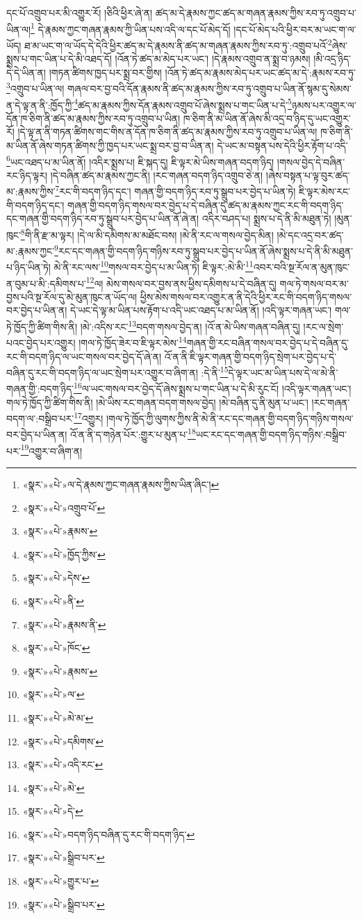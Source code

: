 དང་པོ་འགྲུབ་པར་མི་འགྱུར་རོ། །ཅིའི་ཕྱིར་ཞེ་ན། ཚད་མ་དེ་རྣམས་ཀྱང་ཚད་མ་གཞན་རྣམས་ཀྱིས་རབ་ཏུ་འགྲུབ་པ་ཡིན་ལ།\footnote{«སྣར་»«པེ་»ལ་དེ་རྣམས་ཀྱང་གཞན་རྣམས་ཀྱིས་ཡིན་ཞིང་།} དེ་རྣམས་ཀྱང་གཞན་རྣམས་ཀྱི་ཡིན་པས་འདི་ལ་དང་པོ་མེད་དོ། །དང་པོ་མེད་པའི་ཕྱིར་བར་མ་ཡང་ག་ལ་ཡོད། ཐ་མ་ཡང་ག་ལ་ཡོད་དེ་དེའི་ཕྱིར་ཚད་མ་དེ་རྣམས་ནི་ཚད་མ་གཞན་རྣམས་ཀྱིས་རབ་ཏུ་:འགྲུབ་པའོ་\footnote{«སྣར་»«པེ་»འགྲུབ་པོ་}ཞེས་སྨྲས་པ་གང་ཡིན་པ་དེ་མི་འཐད་དོ། །འོན་ཏེ་ཚད་མ་མེད་པར་ཡང་། །དེ་རྣམས་འགྲུབ་ན་སྨྲ་བ་ཉམས། །མི་འདྲ་ཉིད་དེ་དེ་ཡིན་ན། །གཏན་ཚིགས་ཁྱད་པར་སྨྲ་བར་གྱིས། །འོན་ཏེ་ཚད་མ་རྣམས་མེད་པར་ཡང་ཚད་མ་དེ་:རྣམས་རབ་ཏུ་\footnote{«སྣར་»«པེ་»རྣམས་}འགྲུབ་པ་ཡིན་ལ། གཞལ་བར་བྱ་བའི་དོན་རྣམས་ནི་ཚད་མ་རྣམས་ཀྱིས་རབ་ཏུ་འགྲུབ་པ་ཡིན་ནོ་སྙམ་དུ་སེམས་ན་དེ་ལྟ་ན་ནི་:ཁྱོད་ཀྱི་\footnote{«སྣར་»«པེ་»ཁྱོད་ཀྱིས་}ཚད་མ་རྣམས་ཀྱིས་དོན་རྣམས་འགྲུབ་པོ་ཞེས་སྨྲས་པ་གང་ཡིན་པ་དེ་\footnote{«སྣར་»«པེ་»དེས་}ཉམས་པར་འགྱུར་ལ་དོན་ཁ་ཅིག་ནི་ཚད་མ་རྣམས་ཀྱིས་རབ་ཏུ་འགྲུབ་པ་ཡིན། ཁ་ཅིག་ནི་མ་ཡིན་ནོ་ཞེས་མི་འདྲ་བ་ཉིད་དུ་ཡང་འགྱུར་རོ། །དེ་ལྟ་ན་ནི་གཏན་ཚིགས་གང་གིས་ན་དོན་ཁ་ཅིག་ནི་ཚད་མ་རྣམས་ཀྱིས་རབ་ཏུ་འགྲུབ་པ་ཡིན་ལ། ཁ་ཅིག་ནི་མ་ཡིན་ནོ་ཞེས་གཏན་ཚིགས་ཀྱི་ཁྱད་པར་ཡང་སྨྲ་བར་བྱ་བ་ཡིན་ན། དེ་ཡང་མ་བསྟན་པས་དེའི་ཕྱིར་རྟོག་པ་འདི་\footnote{«སྣར་»«པེ་»ནི་}ཡང་འཐད་པ་མ་ཡིན་ནོ། །འདིར་སྨྲས་པ། ཇི་སྐད་དུ། ཇི་ལྟར་མེ་ཡིས་གཞན་བདག་ཉིད། །གསལ་བྱེད་དེ་བཞིན་རང་ཉིད་ལྟར། །དེ་བཞིན་ཚད་མ་རྣམས་ཀྱང་ནི། །རང་གཞན་བདག་ཉིད་འགྲུབ་ཅེ་ན། །ཞེས་བསྟན་པ་ལྟ་བུར་ཚད་མ་:རྣམས་ཀྱིས་\footnote{«སྣར་»«པེ་»རྣམས་ནི་}རང་གི་བདག་ཉིད་དང་། གཞན་གྱི་བདག་ཉིད་རབ་ཏུ་སྒྲུབ་པར་བྱེད་པ་ཡིན་ཏེ། ཇི་ལྟར་མེས་རང་གི་བདག་ཉིད་དང་། གཞན་གྱི་བདག་ཉིད་གསལ་བར་བྱེད་པ་དེ་བཞིན་དུ་ཚད་མ་རྣམས་ཀྱང་རང་གི་བདག་ཉིད་དང་གཞན་གྱི་བདག་ཉིད་རབ་ཏུ་སྒྲུབ་པར་བྱེད་པ་ཡིན་ནོ་ཞེ་ན། འདིར་བཤད་པ། སྨྲས་པ་དེ་ནི་མི་མཐུན་ཏེ། །མུན་ཁུང་\footnote{«སྣར་»«པེ་»ཁོང་}གི་ནི་རྫ་མ་ལྟར། །དེ་ལ་མི་དམིགས་མ་མཐོང་བས། །མེ་ནི་རང་ལ་གསལ་བྱེད་མིན། །མེ་དང་འདྲ་བར་ཚད་མ་:རྣམས་ཀྱང་\footnote{«སྣར་»«པེ་»རྣམས་}རང་དང་གཞན་གྱི་བདག་ཉིད་གཉིས་རབ་ཏུ་སྒྲུབ་པར་བྱེད་པ་ཡིན་ནོ་ཞེས་སྨྲས་པ་དེ་ནི་མི་མཐུན་པ་ཉིད་ཡིན་ཏེ། མེ་ནི་རང་ལས་\footnote{«སྣར་»«པེ་»ལ་}གསལ་བར་བྱེད་པ་མ་ཡིན་ཏེ། ཇི་ལྟར་:མེ་མི་\footnote{«སྣར་»«པེ་»མེ་མ་}འབར་བའི་སྔ་རོལ་ན་མུན་ཁུང་ན་བུམ་པ་མི་:དམིགས་པ་\footnote{«སྣར་»«པེ་»དམིགས་}ལ། མེས་གསལ་བར་བྱས་ནས་ཕྱིས་དམིགས་པ་དེ་བཞིན་དུ། གལ་ཏེ་གསལ་བར་མ་བྱས་པའི་སྔ་རོལ་དུ་མེ་མུན་ཁུང་ན་ཡོད་ལ། ཕྱིས་མེས་གསལ་བར་འགྱུར་ན་ནི་དེའི་ཕྱིར་རང་གི་བདག་ཉིད་གསལ་བར་བྱེད་པ་ཡིན་ན། དེ་ཡང་དེ་ལྟ་མ་ཡིན་པས་རྟོག་པ་འདི་ཡང་འཐད་པ་མ་ཡིན་ནོ། །འདི་ལྟར་གཞན་ཡང་། གལ་ཏེ་ཁྱོད་ཀྱི་ཚིག་གིས་ནི། །མེ་:འདིས་རང་\footnote{«སྣར་»«པེ་»འདི་རང་}བདག་གསལ་བྱེད་ན། །འོ་ན་མེ་ཡིས་གཞན་བཞིན་དུ། །རང་ལ་སྲེག་པའང་བྱེད་པར་འགྱུར། །གལ་ཏེ་ཁྱོད་ཟེར་བ་ཇི་ལྟར་མེས་\footnote{«སྣར་»«པེ་»མེ་}གཞན་གྱི་རང་བཞིན་གསལ་བར་བྱེད་པ་དེ་བཞིན་དུ་རང་གི་བདག་ཉིད་ལ་ཡང་གསལ་བར་བྱེད་དོ་ཞེ་ན། འོ་ན་ནི་ཇི་ལྟར་གཞན་གྱི་བདག་ཉིད་སྲེག་པར་བྱེད་པ་དེ་བཞིན་དུ་རང་གི་བདག་ཉིད་ལ་ཡང་སྲེག་པར་འགྱུར་བ་ཞིག་ན། :དེ་ནི་\footnote{«སྣར་»«པེ་»དེ་}དེ་ལྟར་ཡང་མ་ཡིན་པས་དེ་ལ་མེ་ནི་གཞན་གྱི་:བདག་ཉིད་\footnote{«སྣར་»«པེ་»བདག་ཉིད་བཞིན་དུ་རང་གི་བདག་ཉིད་}ལ་ཡང་གསལ་བར་བྱེད་དོ་ཞེས་སྨྲས་པ་གང་ཡིན་པ་དེ་མི་རུང་ངོ། །འདི་ལྟར་གཞན་ཡང་། གལ་ཏེ་ཁྱོད་ཀྱི་ཚིག་གིས་ནི། །མེ་ཡིས་རང་གཞན་བདག་གསལ་བྱེད། །མེ་བཞིན་དུ་ནི་མུན་པ་ཡང་། །རང་གཞན་བདག་ལ་:བསྒྲིབ་པར་\footnote{«སྣར་»«པེ་»སྒྲིབ་པར་}འགྱུར། །གལ་ཏེ་ཁྱོད་ཀྱི་ལུགས་ཀྱིས་ནི་མེ་ནི་རང་དང་གཞན་གྱི་བདག་ཉིད་གཉིས་གསལ་བར་བྱེད་པ་ཡིན་ན། འོ་ན་ནི་ད་གཉེན་པོར་:གྱུར་པ་མུན་པ་\footnote{«སྣར་»«པེ་»གྱུར་པ་}ཡང་རང་དང་གཞན་གྱི་བདག་ཉིད་གཉིས་:བསྒྲིབ་པར་\footnote{«སྣར་»«པེ་»སྒྲིབ་པར་}འགྱུར་བ་ཞིག་ན། 